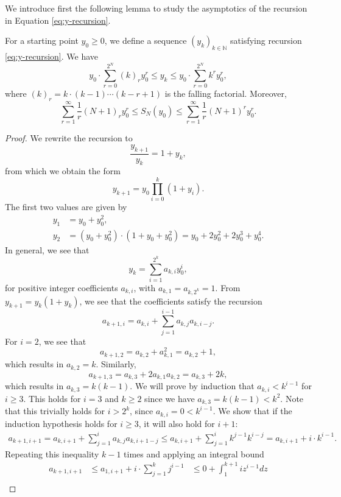 \documentclass{article}
\begin{document}
\begin{toappendix}
We introduce first the following lemma to study the asymptotics of the  recursion in Equation \eqref{eq:y-recursion}.
\begin{lemma}\label{lem:x-seq-sum}
    For a starting point $y_0\ge0$, we define a sequence $(y_k)_{k\in\mathbb N}$ satisfying recursion \eqref{eq:y-recursion}.
    We have
    \[
    y_0\cdot\sum_{r=0}^{2^N}(k)_ry_0^r\le y_k\le y_0\cdot\sum_{r=0}^{2^N}k^ry_0^r,
    \]
    where $(k)_r=k\cdot(k-1)\cdots(k-r+1)$ is the falling factorial.
    Moreover,
    \[
    \sum_{r=1}^\infty \frac{1}{r}(N+1)_ry_0^r \le S_N(y_0)\le \sum_{r=1}^{\infty} \frac{1}{r}(N+1)^ry_0^r.
    \]
\end{lemma}
\begin{proof}
    We rewrite the recursion to
    \[
    \frac{y_{k+1}}{y_k}=1+y_k,
    \]
    from which we obtain the form
    \[
    y_{k+1}=y_0\prod_{i=0}^{k}(1+y_i).
    \]
    The first two values are given by
    \begin{align*}
        y_1&=y_0+y_0^2,\\
        y_2&=(y_0+y_0^2)\cdot(1+y_0+y_0^2)=y_0+2y_0^2+2y_0^3+y_0^4.
    \end{align*}
    In general, we see that
    \[
    y_k=\sum_{i=1}^{2^k}a_{k,i}y_0^i,
    \]
    for positive integer coefficients $a_{k,i}$, with $a_{k,1}=a_{k,2^k}=1$.
    From $y_{k+1}=y_k(1+y_k)$, we see that the coefficients satisfy the recursion
    \[
        a_{k+1,i}=a_{k,i}+\sum_{j=1}^{i-1}a_{k,j}a_{k,i-j}.
    \]
    For $i=2$, we see that
    \[
        a_{k+1,2}=a_{k,2}+a_{k,1}^2=a_{k,2}+1,
    \]
    which results in $a_{k,2}=k$. Similarly,
    \[
        a_{k+1,3}=a_{k,3}+2a_{k,1}a_{k,2}=a_{k,3}+2k,
    \]
    which results in $a_{k,3}=k(k-1)$.
    We will prove by induction that $a_{k,i}< k^{i-1}$ for $i\ge3$. 
    This holds for $i=3$ and $k\ge2$ since we have $a_{k,3}=k(k-1)<k^2$. Note that this trivially holds for $i>2^k$, since $a_{k,i}=0<k^{i-1}$.  We show that if the induction hypothesis holds for $i\ge3$, it will also hold for $i+1$:
    \begin{align*}
        a_{k+1,i+1}
        =a_{k,i+1}+\sum_{j=1}^{i}a_{k,j}a_{k,i+1-j}
        \le a_{k,i+1}+\sum_{j=1}^{i}k^{j-1}k^{i-j}
        =a_{k,i+1}+i\cdot k^{i-1}.
    \end{align*}
    Repeating this inequality $k-1$ times and applying an integral bound
    \begin{eqnarray*}
        a_{k+1,i+1}
        &\le a_{1,i+1}+i\cdot\sum_{j=1}^kj^{i-1}
        &\le 0+\int_1^{k+1} iz^{i-1}dz\\

\end{eqnarray*}
\end{proof}
\end{toappendix}
\end{document}
